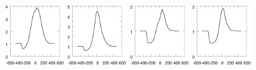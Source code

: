 \documentclass{article}
\begin{document}
\begin{figure}
    \includegraphics[width=0.24\textwidth]{profHa3wind606090}
    \includegraphics[width=0.24\textwidth]{profHa3wind603060}
    \includegraphics[width=0.24\textwidth]{profHb3wind606090}    
    \includegraphics[width=0.24\textwidth]{profHb3wind603060}
    

\end{figure}
\end{document}
